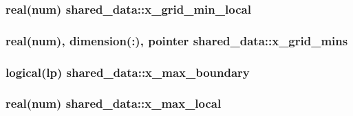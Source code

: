 \subsubsection[{\texorpdfstring{x\+\_\+grid\+\_\+min\+\_\+local}{x_grid_min_local}}]{\setlength{\rightskip}{0pt plus 5cm}real(num) shared\+\_\+data\+::x\+\_\+grid\+\_\+min\+\_\+local}\hypertarget{namespaceshared__data_a12ab3a40a19df149a5d322939704a393}{}\label{namespaceshared__data_a12ab3a40a19df149a5d322939704a393}
\subsubsection[{\texorpdfstring{x\+\_\+grid\+\_\+mins}{x_grid_mins}}]{\setlength{\rightskip}{0pt plus 5cm}real(num), dimension(\+:), pointer shared\+\_\+data\+::x\+\_\+grid\+\_\+mins}\hypertarget{namespaceshared__data_ab595b2b077b3dd6067602742e089c333}{}\label{namespaceshared__data_ab595b2b077b3dd6067602742e089c333}
\subsubsection[{\texorpdfstring{x\+\_\+max\+\_\+boundary}{x_max_boundary}}]{\setlength{\rightskip}{0pt plus 5cm}logical(lp) shared\+\_\+data\+::x\+\_\+max\+\_\+boundary}\hypertarget{namespaceshared__data_ac0044d1bc7bb3189c0c1294d8b71b0d0}{}\label{namespaceshared__data_ac0044d1bc7bb3189c0c1294d8b71b0d0}
\subsubsection[{\texorpdfstring{x\+\_\+max\+\_\+local}{x_max_local}}]{\setlength{\rightskip}{0pt plus 5cm}real(num) shared\+\_\+data\+::x\+\_\+max\+\_\+local}\hypertarget{namespaceshared__data_ab8f75a4e4e6aa88619c4f1cfde4dae1c}{}\label{namespaceshared__data_ab8f75a4e4e6aa88619c4f1cfde4dae1c}
